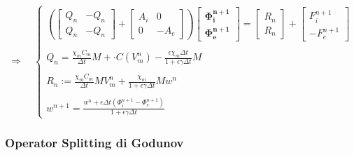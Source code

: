 \documentclass[a4paper]{article}
\theoremstyle{definition}
\begin{document}
\begin{equation}
\Rightarrow \quad
\begin{cases}
\left(
\begin{bmatrix} Q_n & -Q_n \\ Q_n & -Q_n \end{bmatrix} + 
\begin{bmatrix} A_i & 0 \\ 0 & -A_e\end{bmatrix}
\right)
\begin{bmatrix}
\bm{\Phi_i^{n+1}} \\ \bm{\Phi_e^{n+1}}
\end{bmatrix}
= \begin{bmatrix} R_n \\ R_n \end{bmatrix} + \begin{bmatrix} F_i^{n+1} \\  -F_e^{n+1}\end{bmatrix} \\ \\
Q_n = \frac{\displaystyle \chi_m C_m}{\displaystyle \Delta t}M +  \cdot C(V_m^n) - \frac{\displaystyle \epsilon\chi_m \Delta t}{\displaystyle 1 + \epsilon \gamma \Delta t}M \\ \\
R_n := \frac{\displaystyle \chi_mC_m}{\displaystyle \Delta t}MV_m^n + \frac{\displaystyle \chi_m}{\displaystyle 1+\epsilon\gamma\Delta t}M w^n \\ \\
w^{n+1} = \frac{\displaystyle w^n + \epsilon \Delta t (\Phi_i^{n+1}-\Phi_e^{n+1})}{\displaystyle 1+\epsilon \gamma \Delta t}
\end{cases}
\end{equation}


\vspace{5mm}
\subsubsection{Operator Splitting di Godunov}
\end{document}
